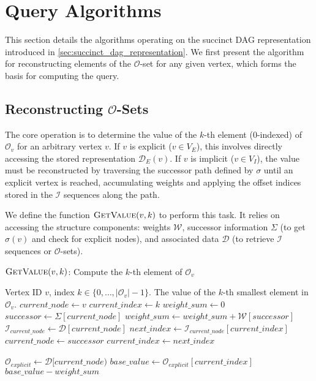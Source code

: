 \section{Query Algorithms}
\label{sec:query_algorithms}

This section details the algorithms operating on the succinct DAG representation introduced in \autoref{sec:succinct_dag_representation}. We first present the algorithm for reconstructing elements of the $\mathcal{O}$-set for any given vertex, which forms the basis for computing the \Rank{} query.

\subsection{Reconstructing $\mathcal{O}$-Sets}
\label{subsec:reconstructing_o_sets}

The core operation is to determine the value of the $k$-th element ($0$-indexed) of $\mathcal{O}_v$ for an arbitrary vertex $v$. If $v$ is explicit ($v \in V_E$), this involves directly accessing the stored representation $\mathcal{D}_E(v)$. If $v$ is implicit ($v \in V_I$), the value must be reconstructed by traversing the successor path defined by $\sigma$ until an explicit vertex is reached, accumulating weights and applying the offset indices stored in the $\mathcal{I}$ sequences along the path.

We define the function $\textsc{GetValue}(v, k)$ to perform this task. It relies on accessing the structure components: weights $\mathcal{W}$, successor information $\Sigma$ (to get $\sigma(v)$ and check for explicit nodes), and associated data $\mathcal{D}$ (to retrieve $\mathcal{I}$ sequences or $\mathcal{O}$-sets).

\begin{algorithm}
    \caption{$\textsc{GetValue}(v, k)$: Compute the $k$-th element of $\mathcal{O}_v$}
    \label{alg:get_value}
    \small
    \begin{algorithmic}[1]
        \Require Vertex ID $v$, index $k \in \{0, \dots, |\mathcal{O}_v|-1\}$.
        \Ensure The value of the $k$-th smallest element in $\mathcal{O}_v$.
        \State $current\_node \gets v$
        \State $current\_index \gets k$
        \State $weight\_sum \gets 0$
        \State $successor \gets \Sigma[current\_node]$
        \State $weight\_sum \gets weight\_sum + \mathcal{W}[successor]$
        \State $\mathcal{I}_{current\_node} \gets \mathcal{D}[current\_node]$
        \State $next\_index \gets \mathcal{I}_{current\_node}[current\_index]$
        \State $current\_node \gets successor$
        \State $current\_index \gets next\_index$
        \EndWhile

        \State $\mathcal{O}_{explicit} \gets \mathcal{D}[current\_node)$
        \State $base\_value \gets \mathcal{O}_{explicit}[current\_index]$
        \State \Return $base\_value - weight\_sum$
    \end{algorithmic}
\end{algorithm}

